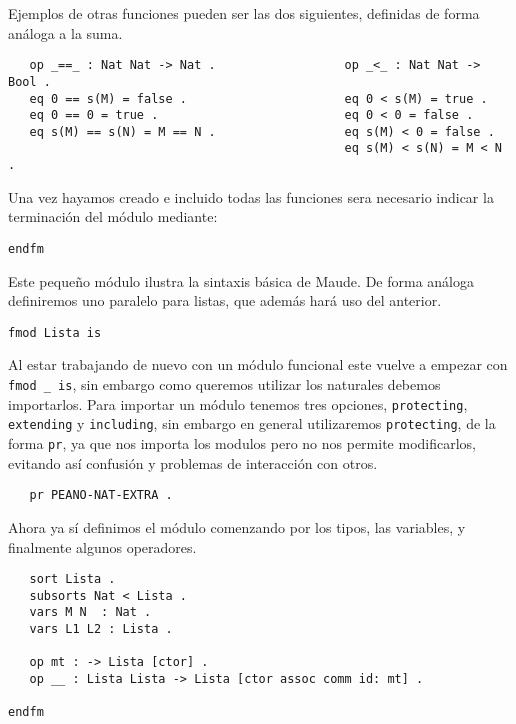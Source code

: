 Ejemplos de otras funciones pueden ser las dos siguientes, definidas de forma análoga a la suma. \par

{\codesize
\begin{verbatim}
   op _==_ : Nat Nat -> Nat .                  op _<_ : Nat Nat -> Bool .
   eq 0 == s(M) = false .                      eq 0 < s(M) = true .
   eq 0 == 0 = true .                          eq 0 < 0 = false .
   eq s(M) == s(N) = M == N .                  eq s(M) < 0 = false .
                                               eq s(M) < s(N) = M < N .	

\end{verbatim}
}

Una vez hayamos creado e incluido todas las funciones sera necesario indicar la terminación del módulo mediante: \par

{\codesize
\begin{verbatim}
endfm
\end{verbatim}
}

Este pequeño módulo ilustra la sintaxis básica de Maude. De forma análoga definiremos uno paralelo para listas, que además hará uso del anterior. \par

{\codesize
\begin{verbatim}
fmod Lista is
\end{verbatim}
}
Al estar trabajando de nuevo con un módulo funcional este vuelve a empezar con \verb"fmod _ is", sin embargo como queremos utilizar los naturales debemos importarlos. Para importar un módulo tenemos tres opciones, \texttt{protecting}, \texttt{extending} y \texttt{including}, sin embargo en general utilizaremos \texttt{protecting}, de la forma \texttt{pr}, ya que nos importa los modulos pero no nos permite modificarlos, evitando así confusión y problemas de interacción con otros. \par

{\codesize
\begin{verbatim}
   pr PEANO-NAT-EXTRA .
\end{verbatim}
}

Ahora ya sí definimos el módulo comenzando por los tipos, las variables, y finalmente algunos operadores. \par

{\codesize
\begin{verbatim}
   sort Lista .
   subsorts Nat < Lista .
   vars M N  : Nat .
   vars L1 L2 : Lista .	

   op mt : -> Lista [ctor] .
   op __ : Lista Lista -> Lista [ctor assoc comm id: mt] .

endfm
\end{verbatim}
}

